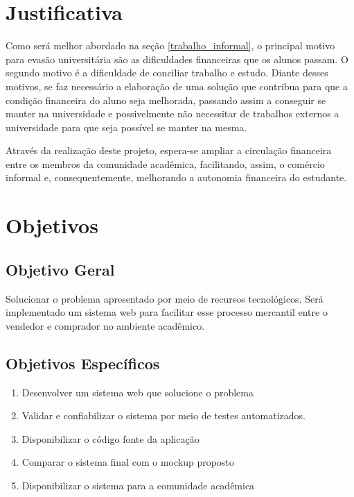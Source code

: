 \section{Justificativa}
\label{sec:justificativa}

Como será melhor abordado na seção \ref{trabalho_informal}, o principal motivo para evasão universitária são as dificuldades financeiras que os alunos passam. O segundo motivo é a dificuldade de conciliar trabalho e estudo. Diante desses motivos, se faz necessário a elaboração de uma solução que contribua para que a condição financeira do aluno seja melhorada, passando assim a conseguir se manter na universidade e possivelmente não necessitar de trabalhos externos a universidade para que seja possível se manter na mesma.

Através da realização deste projeto, espera-se ampliar a circulação financeira entre os membros da comunidade acadêmica, facilitando, assim, o comércio informal e, consequentemente, melhorando a autonomia financeira do estudante.

\section{Objetivos}

\subsection{Objetivo Geral}

Solucionar o problema apresentado por meio de recursos tecnológicos. Será implementado um sistema web para facilitar esse processo mercantil entre o vendedor e comprador no ambiente acadêmico.

\subsection{Objetivos Específicos}
\begin{enumerate}
    \item Desenvolver um sistema web que solucione o problema
    \item Validar e confiabilizar o sistema por meio de testes automatizados.
    \item Disponibilizar o código fonte da aplicação
    \item Comparar o sistema final com o mockup proposto
    \item Disponibilizar o sistema para a comunidade acadêmica
\end{enumerate}


